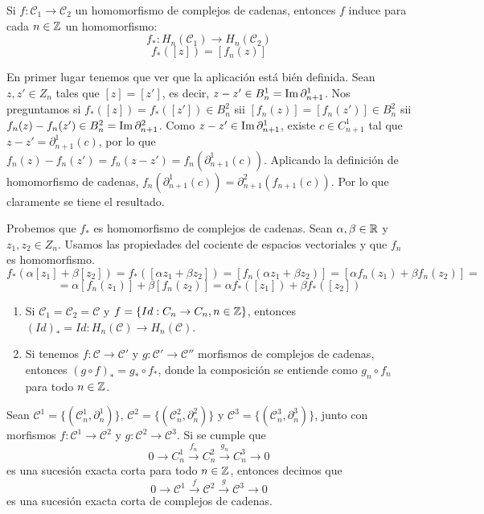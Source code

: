 \documentclass[HS.tex]{subfiles}
\begin{document}
\begin{prop}
Si $f : \mathcal{C}_1 \to \mathcal{C}_2$ un homomorfismo de complejos de cadenas, entonces $f$ induce para cada $n \in \mathbb{Z}$ un homomorfismo:
\[ f_* : H_n(\mathcal{C}_1) \to H_n(\mathcal{C}_2) \]
\[ f_* ([z]) = [f_n(z)] \]
\end{prop}
\begin{dem}
En primer lugar tenemos que ver que la aplicación está bién definida. Sean $z,z'\in Z_n$ tales que $[z]=[z']$, es decir, $z-z'\in B^1_n=\operatorname{Im} \partial^1_{n+1}$. Nos preguntamos si $f_*([z])=f_*([z'])\in B^2_n$ sii $[f_n(z)]=[f_n(z')]\in B^2_n$ sii $f_n(z)-f_n(z')\in B^2_n=\operatorname{Im} \partial^2_{n+1}$. Como $z-z'\in\operatorname{Im} \partial^1_{n+1}$, existe $c\in C^1_{n+1}$ tal que $z-z'=\partial^1_{n+1}(c)$, por lo que $f_n(z)-f_n(z')=f_n(z-z')=f_n(\partial^1_{n+1}(c))$. Aplicando la definición de homomorfismo de cadenas, $f_n(\partial^1_{n+1}(c))=\partial^2_{n+1}(f_{n+1}(c))$. Por lo que claramente se tiene el resultado.

Probemos que $f_*$ es homomorfismo de complejos de cadenas. Sean $\alpha,\beta\in\mathbb{R}$ y $z_1,z_2\in Z_n$. Usamos las propiedades del cociente de espacios vectoriales y que $f_n$ es homomorfismo.
\[f_*(\alpha[z_1]+\beta[z_2])=f_*([\alpha z_1+\beta z_2])=[f_n(\alpha z_1+\beta z_2)]=[\alpha f_n(z_1)+\beta f_n(z_2)]=\]
\[=\alpha[f_n(z_1)]+\beta[f_n(z_2)]=\alpha f_*([z_1])+\beta f_*([z_2])\]
\QED
\end{dem}

\begin{propi}
\begin{enumerate}
\item Si $\mathcal{C}_1=\mathcal{C}_2=\mathcal{C}$ y $f=\{Id:C_n\to C_n, n\in\mathbb{Z}\}$, entonces $(Id)_*=Id:H_n(\mathcal{C})\to H_n(\mathcal{C})$. 
\item Si tenemos $f:\mathcal{C}\to\mathcal{C}'$ y $g:\mathcal{C}'\to\mathcal{C}''$ morfismos de complejos de cadenas, entonces $(g\circ f)_*=g_*\circ f_*$, donde la composición se entiende como $g_n\circ f_n$ para todo $n\in\mathbb{Z}$.
\end{enumerate}
\end{propi}

\begin{defi}
Sean $\mathcal{C}^1=\{(\mathcal{C}^1_n,\partial_n^1)\}$, $\mathcal{C}^2=\{(\mathcal{C}^2_n,\partial_n^2)\}$ y $\mathcal{C}^3=\{(\mathcal{C}^3_n,\partial_n^3)\}$, junto con morfismos $f:\mathcal{C}^1\to\mathcal{C}^2$ y $g:\mathcal{C}^2\to\mathcal{C}^3$. Si se cumple que
\[
0\to C_n^1\overset{f_n}{\to}C_n^2\overset{g_n}{\to}C_n^3\to 0
\]
es una sucesión exacta corta para todo $n\in\mathbb{Z}$, entonces decimos que
\[
0\to \mathcal{C}^1\overset{f}{\to}\mathcal{C}^2\overset{g}{\to}\mathcal{C}^3\to 0
\]
es una sucesión exacta corta de complejos de cadenas.
\end{defi}
\end{document}
